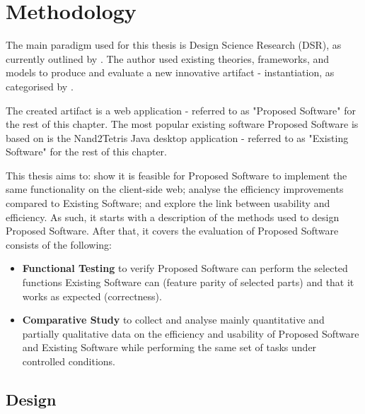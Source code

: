\chapter{Methodology}

The main paradigm used for this thesis is Design Science Research (DSR), as currently outlined by \textcite{brocke2020designscience}.
The author used existing theories, frameworks, and models to produce and evaluate a new innovative artifact - instantiation, as categorised by \textcite{hevner2004designscience}.

The created artifact is a web application - referred to as "Proposed Software" for the rest of this chapter.
The most popular existing software Proposed Software is based on is the Nand2Tetris Java desktop application - referred to as "Existing Software" for the rest of this chapter.

This thesis aims to: show it is feasible for Proposed Software to implement the same functionality on the client-side web; analyse the efficiency improvements compared to Existing Software; and explore the link between usability and efficiency.
As such, it starts with a description of the methods used to design Proposed Software.
After that, it covers the evaluation of Proposed Software consists of the following:

\begin{itemize}
    \item \textbf{Functional Testing} to verify Proposed Software can perform the selected functions Existing Software can (feature parity of selected parts) and that it works as expected (correctness).
    \item \textbf{Comparative Study} to collect and analyse mainly quantitative and partially qualitative data on the efficiency and usability of Proposed Software and Existing Software while performing the same set of tasks under controlled conditions.
\end{itemize}

\section{Design}



